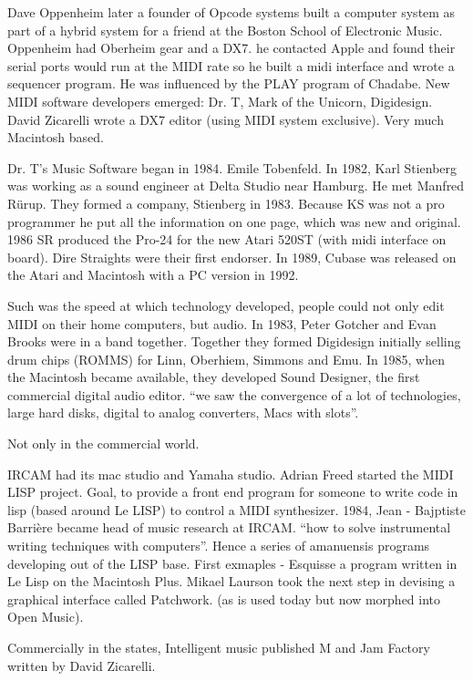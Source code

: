 Dave Oppenheim later a founder of Opcode systems built a computer system as part of a hybrid system for a friend at the Boston School of Electronic Music.  Oppenheim had Oberheim gear and a DX7. he contacted Apple and found their serial ports would run at the MIDI rate so he built a midi interface and wrote a sequencer program.  He was influenced by the PLAY program of Chadabe.  New MIDI software developers emerged: Dr. T, Mark of the Unicorn, Digidesign. David Zicarelli wrote a DX7 editor (using MIDI system exclusive).  Very much Macintosh based.

Dr. T's Music Software began in 1984. Emile Tobenfeld. In 1982, Karl Stienberg was working as a sound engineer at Delta Studio near Hamburg.  He met Manfred R\"urup.  They formed a company, Stienberg in 1983.  Because KS was not a pro programmer he put all the information  on one page, which was new and original. 1986 SR produced the Pro-24 for the new Atari 520ST (with midi interface on board).  Dire Straights were their first endorser. In 1989, Cubase was released on the Atari and Macintosh with a PC version in 1992.  

Such was the speed at which technology developed, people could not only edit MIDI on their home computers, but audio. In 1983, Peter Gotcher and Evan Brooks were in a band together. Together they formed Digidesign initially selling drum chips (ROMMS) for Linn, Oberhiem, Simmons and Emu. In 1985, when the Macintosh became available, they developed Sound Designer, the first commercial digital audio editor.  ``we saw the convergence of a lot of technologies, large hard disks, digital to analog converters, Macs with slots''.

Not only in the commercial world.

 IRCAM had its mac studio and Yamaha studio.  Adrian Freed started the MIDI LISP project.  Goal, to provide a front end program for someone to write code in lisp (based around Le LISP) to control a MIDI synthesizer. 1984, Jean - Bajptiste Barri\`ere became head of music research at IRCAM.  ``how to solve instrumental writing techniques with computers''.  Hence a series of amanuensis programs developing out of the LISP base.   First exmaples - Esquisse a program written in Le Lisp on the Macintosh Plus. Mikael Laurson took the next step in devising a graphical interface called Patchwork. (as is used today but now morphed into Open Music).   

Commercially in the states, Intelligent music published M and Jam Factory written by David Zicarelli.
   
